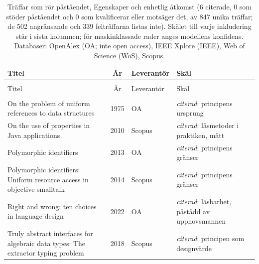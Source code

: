 
\begingroup\footnotesize
\begin{longtable}{@{}%
  >{\raggedright\arraybackslash}p{}c%
  >{\raggedright\arraybackslash}p{}%
  >{\raggedright\arraybackslash}p{}@{}}
\caption{Träffar som rör påståendet, Egenskaper och enhetlig åtkomst (6 citerade, 0 som stöder påståendet och 0 som kvalificerar eller motsäger det, av 847 unika träffar; de 502 angränsande och 339 felträffarna listas inte). Skälet till varje inkludering står i sista kolumnen; för maskinklassade rader anges modellens konfidens. Databaser: OpenAlex (OA; inte open access), IEEE Xplore (IEEE), Web of Science (WoS), Scopus.}\label{tab:sok-egenskaper}\\
\toprule
Titel & År & Leverantör & Skäl \\
\midrule
\endfirsthead
\multicolumn{4}{@{}l}{\emph{\tablename~\thetable{} (forts.)}}\\
\toprule
Titel & År & Leverantör & Skäl \\
\midrule
\endhead
\midrule \multicolumn{4}{r@{}}{\emph{forts.\ på nästa sida}}\\
\endfoot
\bottomrule
\endlastfoot
On the problem of uniform references to data structures & 1975 & OA & \emph{citerad}: principens ursprung \\
On the use of properties in Java applications & 2010 & Scopus & \emph{citerad}: läsmetoder i praktiken, mätt \\
Polymorphic identifiers & 2013 & OA & \emph{citerad}: principens gränser \\
Polymorphic identifiers: Uniform resource access in objective-smalltalk & 2014 & Scopus & \emph{citerad}: principens gränser \\
Right and wrong: ten choices in language design & 2022 & OA & \emph{citerad}: läsbarhet, påstådd av upphovsmannen \\
Truly abstract interfaces for algebraic data types: The extractor typing problem & 2018 & Scopus & \emph{citerad}: principen som designvärde \\
\end{longtable}
\endgroup
